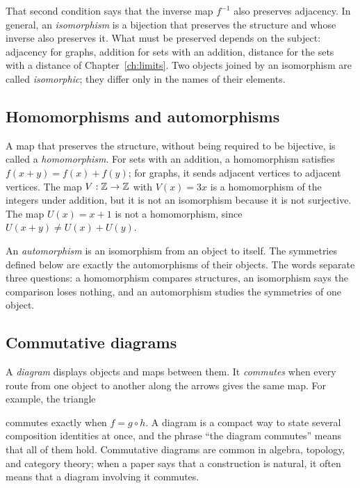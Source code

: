 That second condition says that the inverse map $f^{-1}$ also preserves adjacency. In general, an \emph{isomorphism} is a bijection that preserves the structure and whose inverse also preserves it. What must be preserved depends on the subject: adjacency for graphs, addition for sets with an addition, distance for the sets with a distance of Chapter~\ref{ch:limits}. Two objects joined by an isomorphism are called \emph{isomorphic}; they differ only in the names of their elements.

\subsection*{Homomorphisms and automorphisms}
A map that preserves the structure, without being required to be bijective, is called a \emph{homomorphism}. For sets with an addition, a homomorphism satisfies $f(x+y)=f(x)+f(y)$; for graphs, it sends adjacent vertices to adjacent vertices. The map $V:\mathbb Z\to\mathbb Z$ with $V(x)=3x$ is a homomorphism of the integers under addition, but it is not an isomorphism because it is not surjective. The map $U(x)=x+1$ is not a homomorphism, since $U(x+y)\ne U(x)+U(y)$.

An \emph{automorphism} is an isomorphism from an object to itself. The symmetries defined below are exactly the automorphisms of their objects. The words separate three questions: a homomorphism compares structures, an isomorphism says the comparison loses nothing, and an automorphism studies the symmetries of one object.

\subsection*{Commutative diagrams}
A \emph{diagram} displays objects and maps between them. It \emph{commutes} when every route from one object to another along the arrows gives the same map. For example, the triangle
\begin{center}
\end{center}
commutes exactly when $f=g\circ h$. A diagram is a compact way to state several composition identities at once, and the phrase ``the diagram commutes'' means that all of them hold. Commutative diagrams are common in algebra, topology, and category theory; when a paper says that a construction is natural, it often means that a diagram involving it commutes.


